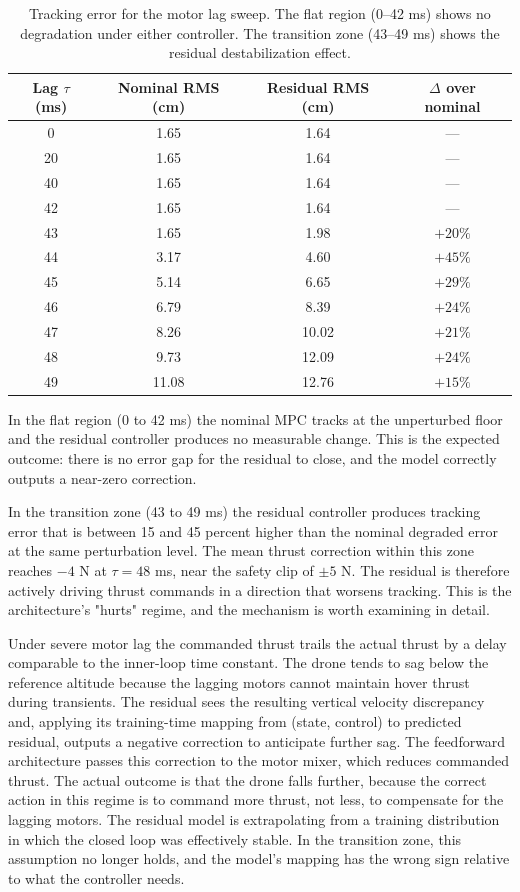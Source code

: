 \documentclass[conference]{IEEEtran}
\begin{document}
\begin{table}[t]
\centering
\caption{Tracking error for the motor lag sweep. The flat region (0--42 ms) shows no degradation under either controller. The transition zone (43--49 ms) shows the residual destabilization effect.}
\label{tab:lag}
\begin{tabular}{cccc}
\toprule
Lag $\tau$ (ms) & Nominal RMS (cm) & Residual RMS (cm) & $\Delta$ over nominal \\
\midrule
0 & 1.65 & 1.64 & --- \\
20 & 1.65 & 1.64 & --- \\
40 & 1.65 & 1.64 & --- \\
42 & 1.65 & 1.64 & --- \\
43 & 1.65 & 1.98 & $+20\%$ \\
44 & 3.17 & 4.60 & $+45\%$ \\
45 & 5.14 & 6.65 & $+29\%$ \\
46 & 6.79 & 8.39 & $+24\%$ \\
47 & 8.26 & 10.02 & $+21\%$ \\
48 & 9.73 & 12.09 & $+24\%$ \\
49 & 11.08 & 12.76 & $+15\%$ \\
\bottomrule
\end{tabular}
\end{table}

In the flat region (0 to 42 ms) the nominal MPC tracks at the unperturbed floor and the residual controller produces no measurable change. This is the expected outcome: there is no error gap for the residual to close, and the model correctly outputs a near-zero correction.

In the transition zone (43 to 49 ms) the residual controller produces tracking error that is between 15 and 45 percent higher than the nominal degraded error at the same perturbation level. The mean thrust correction within this zone reaches $-4$ N at $\tau = 48$ ms, near the safety clip of $\pm 5$ N. The residual is therefore actively driving thrust commands in a direction that worsens tracking. This is the architecture's "hurts" regime, and the mechanism is worth examining in detail.

Under severe motor lag the commanded thrust trails the actual thrust by a delay comparable to the inner-loop time constant. The drone tends to sag below the reference altitude because the lagging motors cannot maintain hover thrust during transients. The residual sees the resulting vertical velocity discrepancy and, applying its training-time mapping from (state, control) to predicted residual, outputs a negative correction to anticipate further sag. The feedforward architecture passes this correction to the motor mixer, which reduces commanded thrust. The actual outcome is that the drone falls further, because the correct action in this regime is to command more thrust, not less, to compensate for the lagging motors. The residual model is extrapolating from a training distribution in which the closed loop was effectively stable. In the transition zone, this assumption no longer holds, and the model's mapping has the wrong sign relative to what the controller needs.
\end{document}
